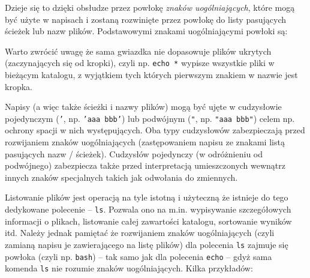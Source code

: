 Dzieje się to dzięki obsłudze przez powłokę \textit{znaków uogólniających}, które mogą być użyte w napisach i zostaną rozwinięte przez powłokę do listy pasujących ścieżek lub nazw plików.
Podstawowymi znakami uogólniającymi powłoki są:
Warto zwrócić uwagę że sama gwiazdka nie dopasowuje plików ukrytych (zaczynających się od kropki), czyli np. \Verb$echo *$ wypisze wszystkie pliki w bieżącym katalogu, z wyjątkiem tych których pierwszym znakiem w nazwie jest kropka.

Napisy (a więc także ścieżki i nazwy plików) mogą być ujęte w cudzysłowie pojedynczym (\texttt{'}, np. \texttt{'aaa bbb'}) lub podwójnym (\texttt{"}, np. \texttt{"aaa bbb"}) celem np. ochrony spacji w nich występujących.
Oba typy cudzysłowów zabezpieczają przed rozwijaniem znaków uogólniających (zastępowaniem napisu ze znakami listą pasujących nazw / ścieżek).
Cudzysłów pojedynczy (w odróżnieniu od podwójnego) zabezpiecza także przed interpretacją umieszczonych wewnątrz innych znaków specjalnych takich jak odwołania do zmiennych.

Listowanie plików jest operacją na tyle istotną i użyteczną że istnieje do tego dedykowane polecenie – \Verb$ls$. Pozwala ono na m.in. wypisywanie szczegółowych informacji o plikach, listowanie całej zawartości katalogu, sortowanie wyników itd.
Należy jednak pamiętać że rozwijaniem znaków uogólniających (czyli zamianą napisu je zawierającego na listę plików) dla polecenia \Verb$ls$ zajmuje się powłoka (czyli np. \Verb$bash$) – tak samo jak dla polecenia \Verb$echo$ – gdyż sama komenda \Verb$ls$ nie rozumie znaków uogólniających.
%
Kilka przykładów:

